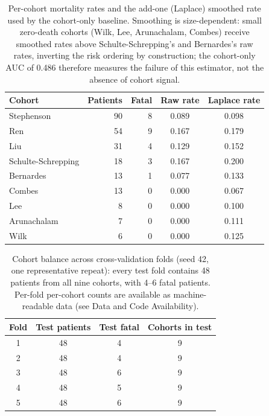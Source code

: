 \documentclass[11pt,a4paper]{article}
\begin{document}
\begin{table}[t]
\centering
\caption{Per-cohort mortality rates and the add-one (Laplace) smoothed rate
used by the cohort-only baseline. Smoothing is size-dependent: small
zero-death cohorts (Wilk, Lee, Arunachalam, Combes) receive smoothed rates
above Schulte-Schrepping's and Bernardes's raw rates, inverting the risk
ordering by construction; the cohort-only AUC of 0.486 therefore measures
the failure of this estimator, not the absence of cohort signal.}
\label{tab:cohort_rates}
\small
\begin{tabular}{lrrcc}
\toprule
\textbf{Cohort} & \textbf{Patients} & \textbf{Fatal} & \textbf{Raw rate} & \textbf{Laplace rate} \\
\midrule
Stephenson & 90 & 8 & 0.089 & 0.098 \\
Ren & 54 & 9 & 0.167 & 0.179 \\
Liu & 31 & 4 & 0.129 & 0.152 \\
Schulte-Schrepping & 18 & 3 & 0.167 & 0.200 \\
Bernardes & 13 & 1 & 0.077 & 0.133 \\
Combes & 13 & 0 & 0.000 & 0.067 \\
Lee & 8 & 0 & 0.000 & 0.100 \\
Arunachalam & 7 & 0 & 0.000 & 0.111 \\
Wilk & 6 & 0 & 0.000 & 0.125 \\
\bottomrule
\end{tabular}
\end{table}

\begin{table}[t]
\centering
\caption{Cohort balance across cross-validation folds (seed 42, one
representative repeat): every test fold contains 48 patients from all nine
cohorts, with 4--6 fatal patients. Per-fold per-cohort counts are available
as machine-readable data (see Data and Code Availability).}
\label{tab:fold_balance}
\small
\begin{tabular}{cccc}
\toprule
\textbf{Fold} & \textbf{Test patients} & \textbf{Test fatal} & \textbf{Cohorts in test} \\
\midrule
1 & 48 & 4 & 9 \\
2 & 48 & 4 & 9 \\
3 & 48 & 6 & 9 \\
4 & 48 & 5 & 9 \\
5 & 48 & 6 & 9 \\
\bottomrule
\end{tabular}
\end{table}
\end{document}
